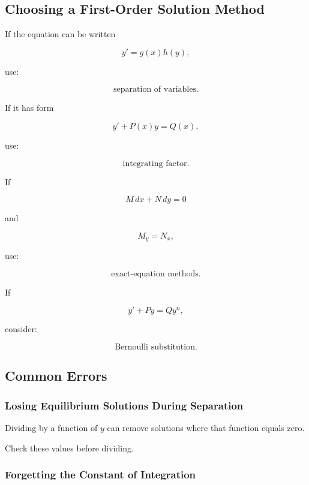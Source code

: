 \subsection{Choosing a First-Order Solution Method}
\label{subsec:choosing-first-order-method}

If the equation can be written

\[
y'=g(x)h(y),
\]

use:

\[
\boxed{
\text{separation of variables}.
}
\]

If it has form

\[
y'+P(x)y=Q(x),
\]

use:

\[
\boxed{
\text{integrating factor}.
}
\]

If

\[
M\,dx+N\,dy=0
\]

and

\[
M_y=N_x,
\]

use:

\[
\boxed{
\text{exact-equation methods}.
}
\]

If

\[
y'+Py=Qy^n,
\]

consider:

\[
\boxed{
\text{Bernoulli substitution}.
}
\]

\subsection{Common Errors}
\label{subsec:ode-common-errors}

\subsubsection{Losing Equilibrium Solutions During Separation}

Dividing by a function of \(y\) can remove solutions where that function
equals zero.

Check these values before dividing.

\subsubsection{Forgetting the Constant of Integration}

